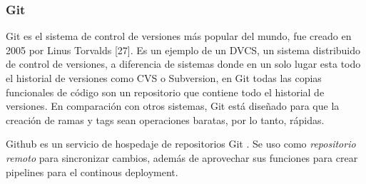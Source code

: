\subsubsection{Git}
Git es el sistema de control de versiones más popular del mundo, fue creado en 2005 por Linus Torvalds [27]. Es un ejemplo de un DVCS, un sistema distribuido de control de versiones, a diferencia de sistemas donde en un solo lugar esta todo el historial de versiones como CVS o Subversion, en Git todas las copias funcionales de código son un repositorio que contiene todo el historial de versiones.
En comparación con otros sistemas, Git está diseñado para que la creación de ramas y tags sean operaciones baratas, por lo tanto, rápidas.

Github es un servicio de hospedaje de repositorios Git \cite{finley2012a}. Se uso como \textit{repositorio remoto} para sincronizar cambios, además de aprovechar sus funciones para crear pipelines para el continous deployment.
